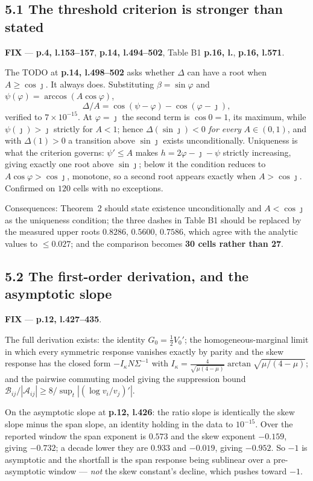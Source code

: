 \documentclass[11pt]{article}
\newcommand{\FIX}{\textcolor{con}{\textbf{FIX}}}
\newcommand{\pl}[2]{\textbf{p.#1, l.#2}}
\begin{document}
\subsection*{5.1 The threshold criterion is stronger than stated}

\FIX{} --- \pl{4}{153--157}, \pl{14}{494--502}, Table B1 \pl{16}{}, \pl{16}{571}.

The TODO at \pl{14}{498--502} asks whether $\Delta$ can have a root when $A\ge\cos\jmath$. It
always does. Substituting $\beta=\sin\varphi$ and $\psi(\varphi)=\arccos(A\cos\varphi)$,
\[
\Delta/A=\cos(\psi-\varphi)-\cos(\varphi-\jmath),
\]
verified to $7\times10^{-15}$. At $\varphi=\jmath$ the second term is $\cos 0=1$, its maximum,
while $\psi(\jmath)>\jmath$ strictly for $A<1$; hence $\Delta(\sin\jmath)<0$ \emph{for every}
$A\in(0,1)$, and with $\Delta(1)>0$ a transition above $\sin\jmath$ exists unconditionally.
Uniqueness is what the criterion governs: $\psi'\le A$ makes
$h=2\varphi-\jmath-\psi$ strictly increasing, giving exactly one root above $\sin\jmath$; below
it the condition reduces to $A\cos\varphi>\cos\jmath$, monotone, so a second root appears exactly
when $A>\cos\jmath$. Confirmed on $120$ cells with no exceptions.

Consequences: Theorem~2 should state existence unconditionally and $A<\cos\jmath$ as the
uniqueness condition; the three dashes in Table B1 should be replaced by the measured upper roots
$0.8286$, $0.5600$, $0.7586$, which agree with the analytic values to $\le 0.027$; and the
comparison becomes \textbf{30 cells rather than 27}.

\subsection*{5.2 The first-order derivation, and the asymptotic slope}

\FIX{} --- \pl{12}{427--435}.

The full derivation exists: the identity $G_0=\tfrac12V_0'$; the homogeneous-marginal limit in
which every symmetric response vanishes exactly by parity and the skew response has the closed
form $-I_\kappa N\Sigma^{-1}$ with
$I_\kappa=\tfrac{4}{\sqrt{\mu(4-\mu)}}\arctan\sqrt{\mu/(4-\mu)}$; and the pairwise commuting model
giving the suppression bound
$\mathcal B_{ij}/|\mathcal A_{ij}|\ge 8/\sup_t|(\log v_i/v_j)'|$.

On the asymptotic slope at \pl{12}{426}: the ratio slope is identically the skew slope minus the
span slope, an identity holding in the data to $10^{-15}$. Over the reported window the span
exponent is $0.573$ and the skew exponent $-0.159$, giving $-0.732$; a decade lower they are
$0.933$ and $-0.019$, giving $-0.952$. So $-1$ is asymptotic and the shortfall is the span
response being sublinear over a pre-asymptotic window --- \emph{not} the skew constant's decline,
which pushes toward $-1$.
\end{document}
